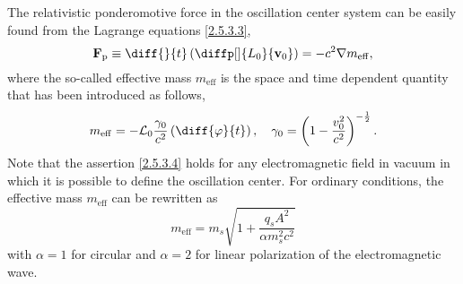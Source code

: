 The relativistic ponderomotive force in the oscillation center system can be easily found from the Lagrange equations \ref{2.5.3.3},
\begin{equation}
\vec{F}_{\mathrm{p}} \equiv \diff{}{t} \left( \diffp[]{L_0}{\vec{v}_0} \right) = -c^2 \grad{m_{\mathrm{eff}}},
\end{equation}
where the so-called effective mass $ m_{\mathrm{eff}} $ is the space and time dependent quantity that has been introduced as follows,
\begin{equation}
\label{2.5.3.4}
m_{\mathrm{eff}} = - \mathcal{L}_0 \frac{\gamma_0}{c^2} \left( \diff{\varphi}{t} \right), \quad  \gamma_0 = \left(1 - \frac{v_0^{2}}{c^{2}} \right)^{-\frac{1}{2}}.
\end{equation}
Note that the assertion \ref{2.5.3.4} holds for any electromagnetic field in vacuum in which it is possible to define the oscillation center. For ordinary conditions, the effective mass $ m_{\mathrm{eff}} $ can be rewritten as
\begin{equation}
m_{\mathrm{eff}} = m_s \sqrt{1 + \frac{q_s A^2}{\alpha m_s^2 c^2}}
\end{equation}
with $ \alpha = 1 $ for circular and $ \alpha = 2 $ for linear polarization of the electromagnetic wave. 